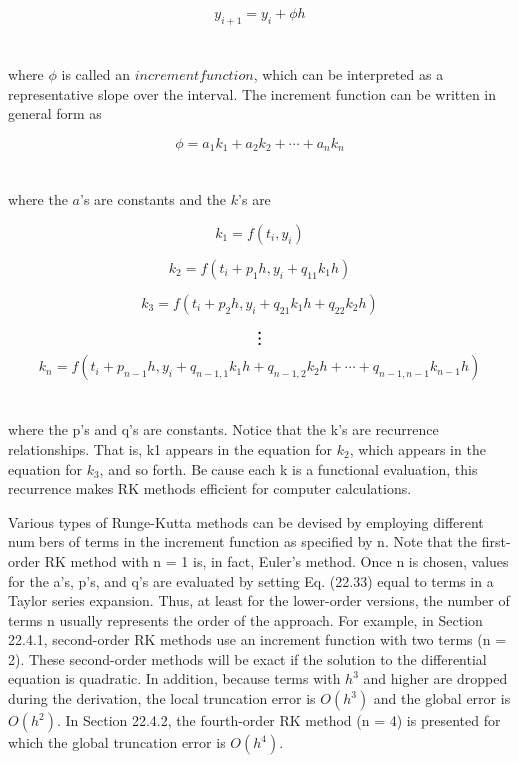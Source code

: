 \begin{equation}
\tag{22.33}
y_{i+1} = y_{i} + \phi h
\end{equation}\\
\\
where $\phi$ is called an $increment function$, which can be interpreted as a representative slope
over the interval. The increment function can be written in general form as

\begin{equation}
\tag{22.34}
\phi = a_{1}k_{1} + a_{2}k_{2} + \cdots + a_{n}k_{n}
\end{equation}\\
\\
where the $a$’s are constants and the $k$’s are

\begin{equation}
\tag{22.34a}
k_{1} = f(t_{i}, y_{i})
\end{equation}

\begin{equation}
\tag{22.34b}
k_{2} = f( t_{i} + p_{1}h, y_{i} + q_{11}k_{1}h)
\end{equation}

\begin{equation}
\tag{22.34c}
k_{3} = f(t_{i} + p_{2}h, y_{i} + q_{21}k_{1}h + q_{22}k_{2}h)
\end{equation}
$$\textbf{\vdots}$$
\begin{equation}
\tag{22.34d}
k_{n} = f( t_{i} + p_{n-1}h, y_{i} + q_{n-1,1} k_{1} h + q_{n-1,2}k_{2}h + \cdots + q_{n-1, n-1} k_{n-1} h )
\end{equation}\\
\\
where the p’s and q’s are constants. Notice that the k’s are recurrence relationships. That is,
k1 appears in the equation for $k_{2}$, which appears in the equation for $k_{3}$, and so forth. Because each k is a functional evaluation, this recurrence makes RK methods efficient for
computer calculations.

Various types of Runge-Kutta methods can be devised by employing different numbers of terms in the increment function as specified by n. Note that the first-order RK
method with n = 1 is, in fact, Euler’s method. Once n is chosen, values for the a’s, p’s, and
q’s are evaluated by setting Eq. (22.33) equal to terms in a Taylor series expansion. Thus,
at least for the lower-order versions, the number of terms n usually represents the order of
the approach. For example, in Section 22.4.1, second-order RK methods use an increment
function with two terms (n = 2). These second-order methods will be exact if the solution
to the differential equation is quadratic. In addition, because terms with $h^3$ and higher are
dropped during the derivation, the local truncation error is $O(h^3)$ and the global error is $O(h^2)$. In Section 22.4.2, the fourth-order RK method (n = 4) is presented for which the
global truncation error is $O(h^4)$.

